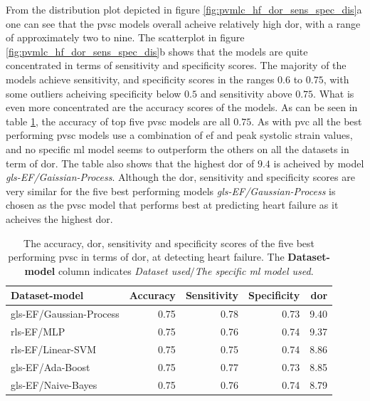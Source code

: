 From the distribution plot depicted in figure \ref{fig:pvmlc_hf_dor_sens_spec_dis}a one can see that the \acrshort{pvsc} models overall acheive relatively high \acrshort{dor}, with a range of approximately two to nine. The scatterplot in figure \ref{fig:pvmlc_hf_dor_sens_spec_dis}b shows that the models are quite concentrated in terms of sensitivity and specificity scores. The majority of the models achieve sensitivity, and specificity scores in the ranges $0.6$ to $0.75$, with some outliers acheiving specificity below $0.5$ and sensitivity above $0.75$. What is even more concentrated are the accuracy scores of the models. As can be seen in table \ref{tab:pvmlc_hf_dor_sens_spec_dis}, the accuracy of top five \acrshort{pvsc} models are all $0.75$. As with \acrshort{pvc} all the best performing \acrshort{pvsc} models use a combination of \acrshort{ef} and peak systolic strain values, and no specific \acrshort{ml} model seems to outperform the others on all the datasets in term of \acrshort{dor}. The table also shows that the highest \acrshort{dor} of $9.4$ is acheived by model \textit{gls-EF/Gaissian-Process}. Although the \acrshort{dor}, sensitivity and specificity scores are very similar for the five best performing models \textit{gls-EF/Gaussian-Process} is chosen as the \acrshort{pvsc} model that performs best at predicting heart failure as it acheives the highest \acrshort{dor}.


\begin{table}
    \centering
    \begin{tabular}{lrrrr}
        \toprule
        Dataset-model           &  Accuracy &  Sensitivity &  Specificity &  \acrshort{dor} \\
        \midrule
        gls-EF/Gaussian-Process &      0.75 &         0.78 &         0.73 & 9.40 \\
        rls-EF/MLP              &      0.75 &         0.76 &         0.74 & 9.37 \\
        rls-EF/Linear-SVM       &      0.75 &         0.75 &         0.74 & 8.86 \\
        gls-EF/Ada-Boost        &      0.75 &         0.77 &         0.73 & 8.85 \\
        gls-EF/Naive-Bayes      &      0.75 &         0.76 &         0.74 & 8.79 \\
        \bottomrule
    \end{tabular}
    \caption{The accuracy, \acrshort{dor}, sensitivity and specificity scores of the five best performing \acrshort{pvsc} in terms of \acrshort{dor}, at detecting heart failure. The \textbf{Dataset-model} column indicates \textit{Dataset used}$/$\textit{The specific \acrshort{ml} model used}.}
    \label{tab:pvmlc_hf_dor_sens_spec_dis}
\end{table}

